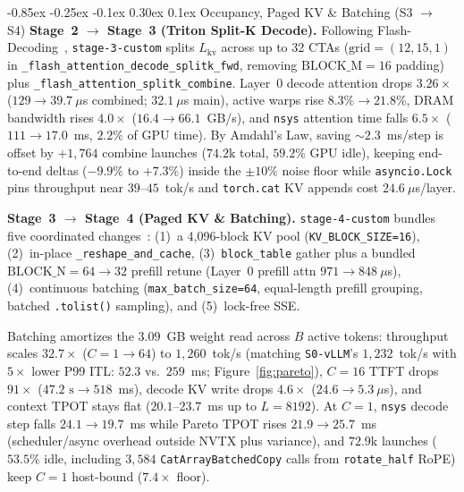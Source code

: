 \documentclass[10pt,twocolumn]{article}
\makeatletter
\renewcommand\subsection{\@startsection{subsection}{2}{\z@}%
  {-0.85ex \@plus -0.25ex \@minus -0.1ex}%
  {0.30ex \@plus 0.1ex}%
  {\normalfont\normalsize\bfseries}}
\newcommand{\code}[1]{\texttt{\small #1}}
\newcommand{\stage}[1]{\texttt{\footnotesize #1}}
\makeatother
\begin{document}
\subsection{Occupancy, Paged KV \& Batching \texorpdfstring{(S3 $\rightarrow$ S4)}{(S3 to S4)}}
\textbf{Stage~2 $\rightarrow$ Stage~3 (Triton Split-K Decode).}
Following Flash-Decoding~\cite{dao2023flashdecoding}, \stage{stage-3-custom} splits $L_{\text{kv}}$ across up to 32 CTAs ($\text{grid}{=}(12, 15, 1)$ in \code{\_flash\_attention\_decode\_splitk\_fwd}, removing $\text{BLOCK\_M}{=}16$ padding) plus \code{\_flash\_attention\_splitk\_combine}. Layer~0 decode attention drops $3.26\times$ ($129 \rightarrow 39.7~\mu$s combined; $32.1~\mu$s main), active warps rise $8.3\% \rightarrow 21.8\%$, DRAM bandwidth rises $4.0\times$ ($16.4 \rightarrow 66.1$~GB/s), and \code{nsys} attention time falls $6.5\times$ ($111 \rightarrow 17.0$~ms, $2.2\%$ of GPU time). By Amdahl's Law, saving $\sim 2.3$~ms/step is offset by $+1{,}764$ combine launches ($74.2\text{k}$ total, $59.2\%$ GPU idle), keeping end-to-end deltas ($-9.9\%$ to $+7.3\%$) inside the $\pm 10\%$ noise floor while \code{asyncio.Lock} pins throughput near $39$--$45$~tok/s and \code{torch.cat} KV appends cost $24.6~\mu$s/layer.

\textbf{Stage~3 $\rightarrow$ Stage~4 (Paged KV \& Batching).}
\stage{stage-4-custom} bundles five coordinated changes~\cite{kwon2023vllm,yu2022orca}: (1)~a 4,096-block KV pool (\code{KV\_BLOCK\_SIZE=16}), (2)~in-place \code{\_reshape\_and\_cache}, (3)~\code{block\_table} gather plus a bundled $\text{BLOCK\_N}=64{\rightarrow}32$ prefill retune (Layer~0 prefill attn $971 \rightarrow 848~\mu$s), (4)~continuous batching (\code{max\_batch\_size=64}, equal-length prefill grouping, batched \code{.tolist()} sampling), and (5)~lock-free SSE.

Batching amortizes the $3.09$~GB weight read across $B$ active tokens: throughput scales $32.7\times$ ($C{=}1 \rightarrow 64$) to $1{,}260$~tok/s (matching \stage{S0-vLLM}'s $1{,}232$~tok/s with $5\times$ lower P99 ITL: $52.3$ vs.\ $259$~ms; Figure~\ref{fig:pareto}), $C{=}16$ TTFT drops $91\times$ ($47.2\text{~s} \rightarrow 518$~ms), decode KV write drops $4.6\times$ ($24.6 \rightarrow 5.3~\mu$s), and context TPOT stays flat ($20.1$--$23.7$~ms up to $L{=}8192$). At $C{=}1$, \code{nsys} decode step falls $24.1 \rightarrow 19.7$~ms while Pareto TPOT rises $21.9 \rightarrow 25.7$~ms (scheduler/async overhead outside NVTX plus variance), and $72.9\text{k}$ launches ($53.5\%$ idle, including $3{,}584$ \code{CatArrayBatchedCopy} calls from \code{rotate\_half} RoPE) keep $C{=}1$ host-bound ($7.4\times$ floor).
\end{document}
